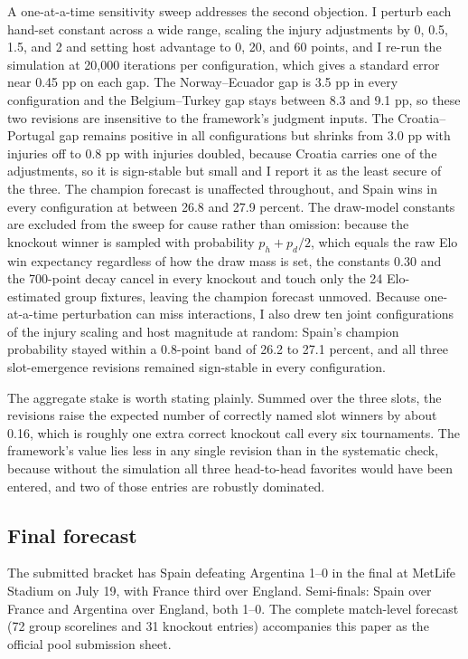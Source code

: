 \documentclass[11pt,a4paper]{article}
\begin{document}
A one-at-a-time sensitivity sweep addresses the second objection. I perturb each hand-set constant across a wide range, scaling the injury adjustments by 0, 0.5, 1.5, and 2 and setting host advantage to 0, 20, and 60 points, and I re-run the simulation at 20{,}000 iterations per configuration, which gives a standard error near 0.45 pp on each gap. The Norway--Ecuador gap is 3.5 pp in every configuration and the Belgium--Turkey gap stays between 8.3 and 9.1 pp, so these two revisions are insensitive to the framework's judgment inputs. The Croatia--Portugal gap remains positive in all configurations but shrinks from 3.0 pp with injuries off to 0.8 pp with injuries doubled, because Croatia carries one of the adjustments, so it is sign-stable but small and I report it as the least secure of the three. The champion forecast is unaffected throughout, and Spain wins in every configuration at between 26.8 and 27.9 percent. The draw-model constants are excluded from the sweep for cause rather than omission: because the knockout winner is sampled with probability $p_h + p_d/2$, which equals the raw Elo win expectancy regardless of how the draw mass is set, the constants $0.30$ and the 700-point decay cancel in every knockout and touch only the 24 Elo-estimated group fixtures, leaving the champion forecast unmoved. Because one-at-a-time perturbation can miss interactions, I also drew ten joint configurations of the injury scaling and host magnitude at random: Spain's champion probability stayed within a 0.8-point band of 26.2 to 27.1 percent, and all three slot-emergence revisions remained sign-stable in every configuration.

The aggregate stake is worth stating plainly. Summed over the three slots, the revisions raise the expected number of correctly named slot winners by about 0.16, which is roughly one extra correct knockout call every six tournaments. The framework's value lies less in any single revision than in the systematic check, because without the simulation all three head-to-head favorites would have been entered, and two of those entries are robustly dominated.

\subsection{Final forecast}

The submitted bracket has Spain defeating Argentina 1--0 in the final at MetLife Stadium on July 19, with France third over England. Semi-finals: Spain over France and Argentina over England, both 1--0. The complete match-level forecast (72 group scorelines and 31 knockout entries) accompanies this paper as the official pool submission sheet.
\end{document}
